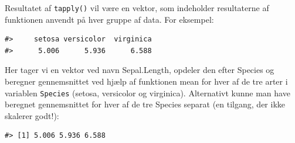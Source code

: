 \documentclass[
]{book}
\newenvironment{Shaded}{\begin{snugshade}}{\end{snugshade}}
\newcommand{\CommentTok}[1]{\textcolor[rgb]{0.37,0.37,0.37}{\textit{#1}}}
\newcommand{\FunctionTok}[1]{\textcolor[rgb]{0.27,0.27,0.27}{\textbf{#1}}}
\newcommand{\NormalTok}[1]{#1}
\newcommand{\OtherTok}[1]{\textcolor[rgb]{0.37,0.37,0.37}{#1}}
\newcommand{\SpecialCharTok}[1]{\textcolor[rgb]{0.43,0.43,0.43}{\textbf{#1}}}
\newcommand{\StringTok}[1]{\textcolor[rgb]{0.5,0.5,0.5}{#1}}
\begin{document}
Resultatet af \texttt{tapply()} vil være en vektor, som indeholder resultaterne af funktionen anvendt på hver gruppe af data. For eksempel:

\begin{Shaded}
\end{Shaded}

\begin{verbatim}
#>     setosa versicolor  virginica 
#>      5.006      5.936      6.588
\end{verbatim}

Her tager vi en vektor ved navn Sepal.Length, opdeler den efter Species og beregner gennemsnittet ved hjælp af funktionen mean for hver af de tre arter i variablen \texttt{Species} (setosa, versicolor og virginica). Alternativt kunne man have beregnet gennemsnittet for hver af de tre Species separat (en tilgang, der ikke skalerer godt!):

\begin{Shaded}
\end{Shaded}

\begin{verbatim}
#> [1] 5.006 5.936 6.588
\end{verbatim}
\end{document}

